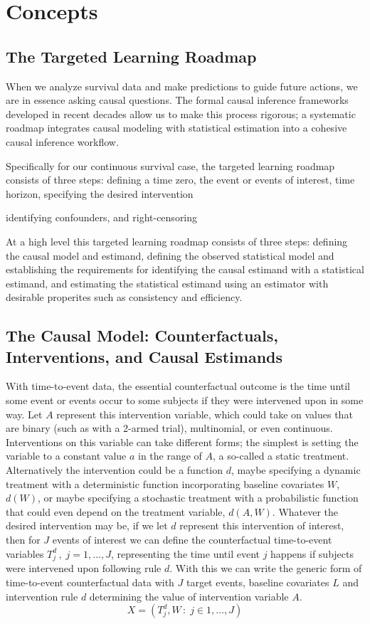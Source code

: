\documentclass{report}
\newcommand{\1}{\ensuremath{\mathbf{1}}}
\renewcommand{\L}{\ensuremath{W}}
\begin{document}
\section{Concepts}
\label{sec:org64bb5cd}

\subsection{The Targeted Learning Roadmap}
\label{sec:org6880234}
When we analyze survival data and make predictions to guide future actions, we are in essence asking causal questions. The formal causal inference frameworks developed in recent decades allow us to make this process rigorous; a systematic roadmap \cite{petersen_causal_2014} integrates causal modeling with statistical estimation into a cohesive causal inference workflow.

Specifically for our continuous survival case, the targeted learning roadmap consists of three steps: defining a time zero, the event or events of interest, time horizon, specifying the desired intervention

identifying confounders, and right-censoring

At a high level this targeted learning roadmap consists of three steps: defining the causal model and estimand, defining the observed statistical model and establishing the requirements for identifying the causal estimand with a statistical estimand, and estimating the statistical estimand using an estimator with desirable properites such as consistency and efficiency.

\subsection{The Causal Model: Counterfactuals, Interventions, and Causal Estimands}
\label{sec:org29400a3}
With time-to-event data, the essential counterfactual outcome is the time until some event or events occur to some subjects if they were intervened upon in some way. Let \(A\) represent this intervention variable, which could take on values that are binary (such as with a 2-armed trial), multinomial, or even continuous. Interventions on this variable can take different forms; the simplest is setting the variable to a constant value \(a\) in the range of \(A\), a so-called a static treatment. Alternatively the intervention could be a function \(d\), maybe specifying a dynamic treatment with a deterministic function incorporating baseline covariates \(\L\), \(d(\L)\), or maybe specifying a stochastic treatment with a probabilistic function that could even depend on the treatment variable, \(d(A, \L)\). Whatever the desired intervention may be, if we let \(d\) represent this intervention of interest, then for \(J\) events of interest we can define the counterfactual time-to-event variables \(T^d_j \,,\; j = 1, ..., J\), representing the time until event \(j\) happens if subjects were intervened upon following rule \(d\). With this we can write the generic form of time-to-event counterfactual data with \(J\) target events, baseline covariates \(L\) and intervention rule \(d\) determining the value of intervention variable \(A\).
\[ X = \left( T^d_j, \L \,:\; j \in 1, \dots, J \right)\]
\end{document}
